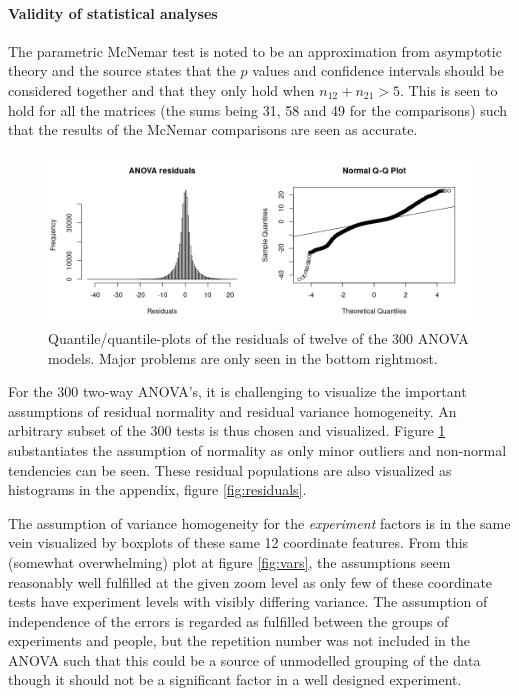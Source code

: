 \documentclass[11pt,fleqn]{article}
\begin{document}
\paragraph{Validity of statistical analyses}
The parametric McNemar test is noted to be an approximation from asymptotic theory and the source \cite{Tue} states that the \(p\) values and confidence intervals should be considered together and that they only hold when \(n_{12}+n_{21}> 5\). This is seen to hold for all the matrices (the sums being 31, 58 and 49 for the comparisons) such that the results of the McNemar comparisons are seen as accurate.
\begin{figure}[H]
	\centering
	\includegraphics[width=.9\textwidth]{qq}
	\caption{Quantile/quantile-plots of the residuals of twelve of the 300 ANOVA models. Major problems are only seen in the bottom rightmost.}\label{fig:qq}
\end{figure}\noindent
For the 300 two-way ANOVA's, it is challenging to visualize the important assumptions of residual normality and residual variance homogeneity. An arbitrary subset of the 300 tests is thus chosen and visualized. Figure \ref{fig:qq} substantiates the assumption of normality as only minor outliers and non-normal tendencies can be seen. These residual populations are also visualized as histograms in the appendix, figure \ref{fig:residuals}.

The assumption of variance homogeneity for the \textit{experiment} factors is in the same vein visualized by boxplots of these same 12 coordinate features. 
From this (somewhat overwhelming) plot at figure \ref{fig:vars}, the assumptions seem reasonably well fulfilled at the given zoom level as only few of these coordinate tests have experiment levels with visibly differing variance.  
The assumption of independence of the errors is regarded as fulfilled between the groups of experiments and people, but the repetition number was not included in the ANOVA such that this could be a source of unmodelled grouping of the data though it should not be a significant factor in a well designed experiment. 
\end{document}
